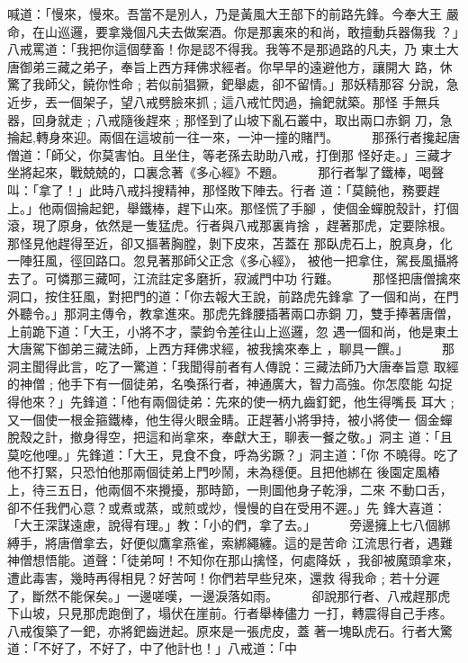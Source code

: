 \begin{pinyinscope}
{喊道：「慢來，慢來。吾當不是別人，乃是黃風大王部下的前路先鋒。今奉大王
嚴命，在山巡邏，要拿幾個凡夫去做案酒。你是那裏來的和尚，敢擅動兵器傷我
？」八戒罵道：「我把你這個孽畜！你是認不得我。我等不是那過路的凡夫，乃
東土大唐御弟三藏之弟子，奉旨上西方拜佛求經者。你早早的遠避他方，讓開大
路，休驚了我師父，饒你性命﹔若似前猖獗，鈀舉處，卻不留情。」那妖精那容
分說，急近步，丟一個架子，望八戒劈臉來抓﹔這八戒忙閃過，掄鈀就築。那怪
手無兵器，回身就走﹔八戒隨後趕來﹔那怪到了山坡下亂石叢中，取出兩口赤銅
刀，急掄起,轉身來迎。兩個在這坡前一往一來，一沖一撞的賭鬥。
　　
那孫行者攙起唐僧道：「師父，你莫害怕。且坐住，等老孫去助助八戒，打倒那
怪好走。」三藏才坐將起來，戰兢兢的，口裏念著《多心經》不題。
　　
那行者掣了鐵棒，喝聲叫：「拿了！」此時八戒抖搜精神，那怪敗下陣去。行者
道：「莫饒他，務要趕上。」他兩個掄起鈀，舉鐵棒，趕下山來。那怪慌了手腳
，使個金蟬脫殼計，打個滾，現了原身，依然是一隻猛虎。行者與八戒那裏肯捨
，趕著那虎，定要除根。那怪見他趕得至近，卻又摳著胸膛，剝下皮來，苫蓋在
那臥虎石上，脫真身，化一陣狂風，徑回路口。忽見著那師父正念《多心經》，
被他一把拿住，駕長風攝將去了。可憐那三藏呵，江流註定多磨折，寂滅門中功
行難。
　　
那怪把唐僧擒來洞口，按住狂風，對把門的道：「你去報大王說，前路虎先鋒拿
了一個和尚，在門外聽令。」那洞主傳令，教拿進來。那虎先鋒腰插著兩口赤銅
刀，雙手捧著唐僧，上前跪下道：「大王，小將不才，蒙鈞令差往山上巡邏，忽
遇一個和尚，他是東土大唐駕下御弟三藏法師，上西方拜佛求經，被我擒來奉上
，聊具一饌。」
　　
那洞主聞得此言，吃了一驚道：「我聞得前者有人傳說：三藏法師乃大唐奉旨意
取經的神僧﹔他手下有一個徒弟，名喚孫行者，神通廣大，智力高強。你怎麼能
勾捉得他來？」先鋒道：「他有兩個徒弟：先來的使一柄九齒釘鈀，他生得嘴長
耳大﹔又一個使一根金箍鐵棒，他生得火眼金睛。正趕著小將爭持，被小將使一
個金蟬脫殼之計，撤身得空，把這和尚拿來，奉獻大王，聊表一餐之敬。」洞主
道：「且莫吃他哩。」先鋒道：「大王，見食不食，呼為劣蹶？」洞主道：「你
不曉得。吃了他不打緊，只恐怕他那兩個徒弟上門吵鬧，未為穩便。且把他綁在
後園定風樁上，待三五日，他兩個不來攪擾，那時節，一則圖他身子乾淨，二來
不動口舌，卻不任我們心意？或煮或蒸，或煎或炒，慢慢的自在受用不遲。」先
鋒大喜道：「大王深謀遠慮，說得有理。」教：「小的們，拿了去。」
　　
旁邊擁上七八個綁縛手，將唐僧拿去，好便似鷹拿燕雀，索綁繩纏。這的是苦命
江流思行者，遇難神僧想悟能。道聲：「徒弟呵！不知你在那山擒怪，何處降妖
，我卻被魔頭拿來，遭此毒害，幾時再得相見？好苦呵！你們若早些兒來，還救
得我命﹔若十分遲了，斷然不能保矣。」一邊嗟嘆，一邊淚落如雨。
　　
卻說那行者、八戒趕那虎下山坡，只見那虎跑倒了，塌伏在崖前。行者舉棒儘力
一打，轉震得自己手疼。八戒復築了一鈀，亦將鈀齒迸起。原來是一張虎皮，蓋
著一塊臥虎石。行者大驚道：「不好了，不好了，中了他計也！」八戒道：「中
}
\end{pinyinscope}
